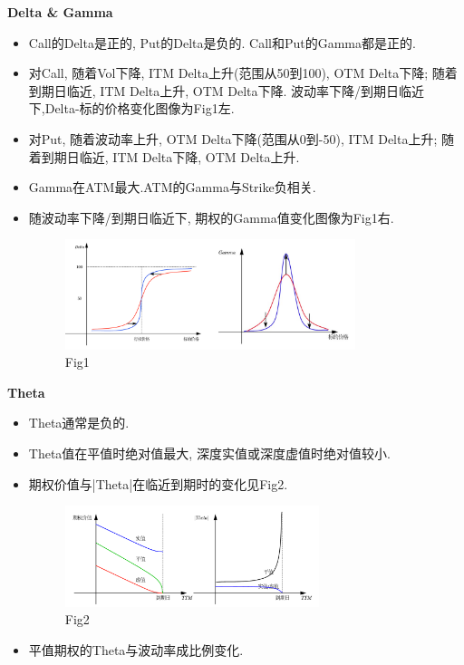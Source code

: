 \documentclass[UTF8]{ctexart}
\begin{document}
\noindent \textbf{Delta \& Gamma} \par
\begin{itemize}
	\item Call的Delta是正的, Put的Delta是负的. Call和Put的Gamma都是正的.
	\item 对Call, 随着Vol下降, ITM Delta上升(范围从50到100), OTM Delta下降;
	      随着到期日临近, ITM Delta上升, OTM Delta下降.
	      波动率下降/到期日临近下,Delta-标的价格变化图像为Fig1左.
	\item 对Put, 随着波动率上升, OTM Delta下降(范围从0到-50), ITM Delta上升;
	      随着到期日临近, ITM Delta下降, OTM Delta上升.
	\item Gamma在ATM最大.ATM的Gamma与Strike负相关.
	\item 随波动率下降/到期日临近下, 期权的Gamma值变化图像为Fig1右.
	      \begin{figure}[H]
		      \centering
		      \includegraphics[width=0.8\textwidth]{fig/fig1.png}
		      \caption{Fig1}
	      \end{figure}

\end{itemize}

\noindent \textbf{Theta} \par
\begin{itemize}
	\item Theta通常是负的.
	\item Theta值在平值时绝对值最大, 深度实值或深度虚值时绝对值较小.
	\item 期权价值与|Theta|在临近到期时的变化见Fig2.
	      \begin{figure}[H]
		      \centering
		      \includegraphics[width=0.7\textwidth]{fig/fig2.png}
		      \caption{Fig2}
	      \end{figure}
	\item 平值期权的Theta与波动率成比例变化.
\end{itemize}
\end{document}
